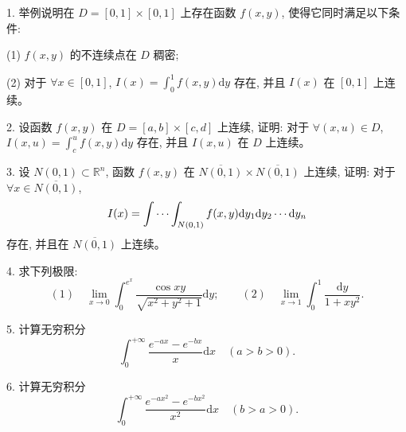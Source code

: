 \documentclass[UTF8, 12pt, fontset=fandol, oneside]{ctexart}
\begin{document}
1. 举例说明在 $D=[0,1]\times[0,1]$ 上存在函数 $f(x,y)$, 使得它同时满足以下条件:

(1) $f(x,y)$ 的不连续点在 $D$ 稠密;

(2) 对于 $\forall x\in[0,1]$, $I(x)=\int_0^1f(x,y)\mathrm dy$ 存在, 并且 $I(x)$ 在 $[0,1]$ 上连续。

2. 设函数 $f(x,y)$ 在 $D=[a,b]\times[c,d]$ 上连续, 证明: 对于 $\forall(x,u)\in D$, $I(x,u)=\int_c^u f(x,y)\mathrm dy$ 存在, 并且 $I(x,u)$ 在 $D$ 上连续。

3. 设 $N(0,1)\subset\mathbb R^n$, 函数 $f(x,y)$ 在 $\overline{N(0,1)}\times\overline{N(0,1)}$ 上连续, 证明: 对于 $\forall x\in\overline{N(0,1)}$,
\[
  I(x)=\idotsint_{N(0,1)}f(x,y)\mathrm dy_1\mathrm dy_2\cdots\mathrm dy_n
\]
存在, 并且在 $\overline{N(0,1)}$ 上连续。

4. 求下列极限:
\[
  (1)\quad \lim_{x\to0}\int_0^{e^x}\frac{\cos xy}{\sqrt{x^2+y^2+1}}\mathrm dy;
  \qquad
  (2)\quad \lim_{x\to1}\int_0^1\frac{\mathrm dy}{1+xy^2}.
\]

5. 计算无穷积分
\[
  \int_0^{+\infty}\frac{e^{-ax}-e^{-bx}}{x}\mathrm dx\quad(a>b>0).
\]

6. 计算无穷积分
\[
  \int_0^{+\infty}\frac{e^{-ax^2}-e^{-bx^2}}{x^2}\mathrm dx\quad(b>a>0).
\]
\end{document}
